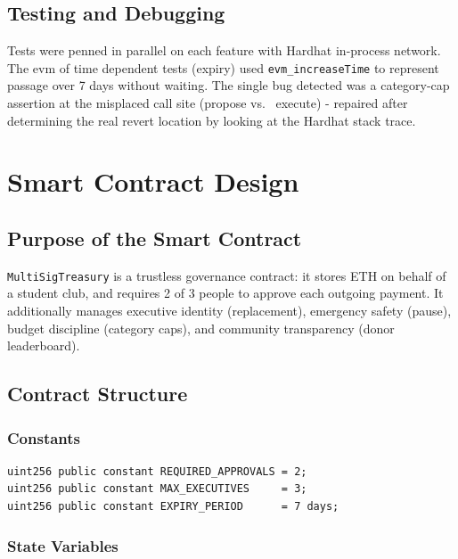 \documentclass[12pt,a4paper]{article}
\begin{document}
\subsection{Testing and Debugging}

Tests were penned in parallel on each feature with Hardhat in-process network. The evm of time dependent tests (expiry) used \texttt{evm\_increaseTime} to represent passage over 7 days without waiting. The single bug detected was a category-cap assertion at the misplaced call site (propose vs. \ execute) - repaired after determining the real revert location by looking at the Hardhat stack trace.

\section{Smart Contract Design}

\subsection{Purpose of the Smart Contract}

\texttt{MultiSigTreasury} is a trustless governance contract: it stores ETH on behalf of a student club, and requires 2 of 3 people to approve each outgoing payment. It additionally manages executive identity (replacement), emergency safety (pause), budget discipline (category caps), and community transparency (donor leaderboard).

\subsection{Contract Structure}
\label{sec:contract-structure}

\subsubsection*{Constants}

\begin{lstlisting}[caption={Constants}]
uint256 public constant REQUIRED_APPROVALS = 2;
uint256 public constant MAX_EXECUTIVES     = 3;
uint256 public constant EXPIRY_PERIOD      = 7 days;
\end{lstlisting}

\subsubsection*{State Variables}
\end{document}
